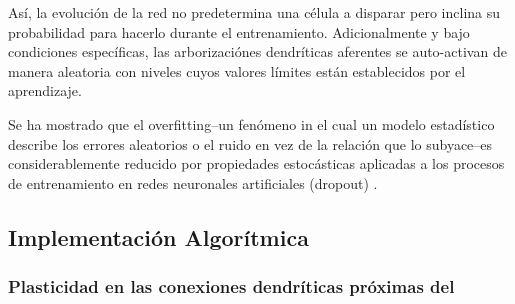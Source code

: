 
Así, la evolución de la red no predetermina una célula a disparar pero inclina su probabilidad para hacerlo durante el entrenamiento. Adicionalmente y bajo condiciones específicas, las arborizaciónes dendríticas aferentes se auto-activan de manera aleatoria con niveles cuyos valores límites están establecidos por el aprendizaje.


Se ha mostrado que el overfitting--un fenómeno in el cual un modelo estadístico describe los errores aleatorios o el ruido en vez de la relación que lo subyace--es considerablemente reducido por propiedades estocásticas aplicadas a los procesos de entrenamiento en redes neuronales artificiales (dropout) \cite{JMLR:v15:srivastava14a}.






\subsection{Implementación Algorítmica}

\subsubsection{Plasticidad en las conexiones dendríticas próximas del }
\label{proximal_dendrites}

